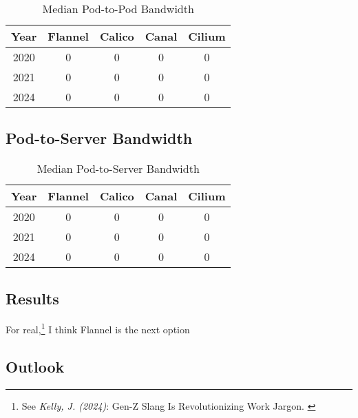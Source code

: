 \begin{table}[h!]
\caption{Median Pod-to-Pod Bandwidth}
\begin{tabular}{|c | c | c | c | c|} 
 \hline
 Year & Flannel & Calico & Canal & Cilium \\
 \hline\hline
 2020 & 0 & 0 & 0 & 0 \\ 
 \hline
 2021 & 0 & 0 & 0 & 0 \\
 \hline
 2024 & 0 & 0 & 0 & 0 \\
 \hline
\end{tabular}
\label{tab:p2pbw}
\end{table}

\subsection{Pod-to-Server Bandwidth}

\begin{table}[h!]
\caption{Median Pod-to-Server Bandwidth}
\begin{tabular}{|c | c | c | c | c|} 
 \hline
 Year & Flannel & Calico & Canal & Cilium \\
 \hline\hline
 2020 & 0 & 0 & 0 & 0 \\ 
 \hline
 2021 & 0 & 0 & 0 & 0 \\
 \hline
 2024 & 0 & 0 & 0 & 0 \\
 \hline
\end{tabular}
\label{tab:p2ebw}
\end{table}

\subsection{Results}

For real,\footnote{See \textit{Kelly, J. (2024)}: Gen-Z Slang Is Revolutionizing Work Jargon. \cite{genzSlang}} I think Flannel is the next option

\subsection{Outlook}
